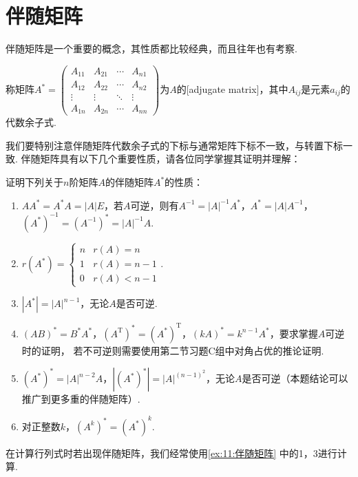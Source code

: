 \section{伴随矩阵}
伴随矩阵是一个重要的概念，其性质都比较经典，而且往年也有考察.
\begin{definition}
    称矩阵$A^*=\begin{pmatrix}
        A_{11} & A_{21} & \cdots & A_{n1} \\
        A_{12} & A_{22} & \cdots & A_{n2} \\
        \vdots & \vdots & \ddots & \vdots \\
        A_{1n} & A_{2n} & \cdots & A_{nn}
    \end{pmatrix}$为$A$的[adjugate matrix]，其中$A_{ij}$是元素$a_{ij}$的代数余子式.
\end{definition}
我们要特别注意伴随矩阵代数余子式的下标与通常矩阵下标不一致，与转置下标一致.
伴随矩阵具有以下几个重要性质，请各位同学掌握其证明并理解：
\begin{example} \label{ex:11:伴随矩阵}
    证明下列关于$n$阶矩阵$A$的伴随矩阵$A^*$的性质：
    \begin{enumerate}
        \item $AA^*=A^*A=|A|E$，若$A$可逆，则有$A^{-1}=|A|^{-1}A^*$，$A^*=|A|A^{-1}$，$(A^*)^{-1}=(A^{-1})^*=|A|^{-1}A$.

        \item $r(A^*)=\begin{cases}
        n & r(A)=n \\ 1 & r(A)=n-1 \\ 0 & r(A) < n-1
    \end{cases}$.

        \item $|A^*|=|A|^{n-1}$，无论$A$是否可逆.

        \item $(AB)^*=B^*A^*$，$(A^\mathrm{T})^*=(A^*)^\mathrm{T}$，$(kA)^*=k^{n-1}A^*$，要求掌握$A$可逆时的证明，
        若不可逆则需要使用第二节习题C组中对角占优的推论证明.

        \item $(A^*)^*=|A|^{n-2}A$，$|(A^*)^*|=|A|^{(n-1)^2}$，无论$A$是否可逆（本题结论可以推广到更多重的伴随矩阵）.

        \item 对正整数$k$，$(A^k)^*=(A^*)^k$.
    \end{enumerate}
\end{example}

在计算行列式时若出现伴随矩阵，我们经常使用\autoref{ex:11:伴随矩阵} 中的1，3进行计算.

